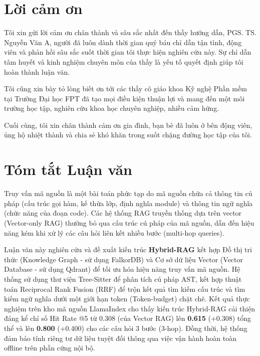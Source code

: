 \documentclass[12pt,a4paper,oneside]{report}
\begin{document}

\chapter*{Lời cảm ơn}
Tôi xin gửi lời cảm ơn chân thành và sâu sắc nhất đến thầy hướng dẫn, PGS. TS. Nguyễn Văn A, người đã luôn dành thời gian quý báu chỉ dẫn tận tình, động viên và phản hồi sâu sắc suốt thời gian tôi thực hiện nghiên cứu này. Sự chỉ dẫn tâm huyết và kinh nghiệm chuyên môn của thầy là yếu tố quyết định giúp tôi hoàn thành luận văn.

Tôi cũng xin bày tỏ lòng biết ơn tới các thầy cô giáo khoa Kỹ nghệ Phần mềm tại Trường Đại học FPT đã tạo mọi điều kiện thuận lợi và mang đến một môi trường học tập, nghiên cứu khoa học chuyên nghiệp, nhiều cảm hứng.

Cuối cùng, tôi xin chân thành cảm ơn gia đình, bạn bè đã luôn ở bên động viên, ủng hộ nhiệt thành và chia sẻ khó khăn trong suốt chặng đường học tập của tôi.

\newpage

\chapter*{Tóm tắt Luận văn}
Truy vấn mã nguồn là một bài toán phức tạp do mã nguồn chứa cả thông tin cú pháp (cấu trúc gọi hàm, kế thừa lớp, định nghĩa module) và thông tin ngữ nghĩa (chức năng của đoạn code). Các hệ thống RAG truyền thống dựa trên vector (Vector-only RAG) thường bỏ qua cấu trúc cú pháp của mã nguồn, dẫn đến hiệu năng kém khi xử lý các câu hỏi liên kết nhiều bước (multi-hop queries). 

Luận văn này nghiên cứu và đề xuất kiến trúc \textbf{Hybrid-RAG} kết hợp Đồ thị tri thức (Knowledge Graph - sử dụng FalkorDB) và Cơ sở dữ liệu Vector (Vector Database - sử dụng Qdrant) để tối ưu hóa hiệu năng truy vấn mã nguồn. Hệ thống sử dụng thư viện Tree-Sitter để phân tích cú pháp AST, kết hợp thuật toán Reciprocal Rank Fusion (RRF) để trộn kết quả tìm kiếm cấu trúc và tìm kiếm ngữ nghĩa dưới một giới hạn token (Token-budget) chặt chẽ. Kết quả thực nghiệm trên kho mã nguồn LlamaIndex cho thấy kiến trúc Hybrid-RAG cải thiện đáng kể chỉ số Hit Rate @5 từ 0.308 (của Vector RAG) lên \textbf{0.615} (+0.308) tổng thể và lên \textbf{0.800} (+0.400) cho các câu hỏi 3 bước (3-hop). Đồng thời, hệ thống đảm bảo tính riêng tư dữ liệu tuyệt đối thông qua việc vận hành hoàn toàn offline trên phần cứng nội bộ.
\end{document}
